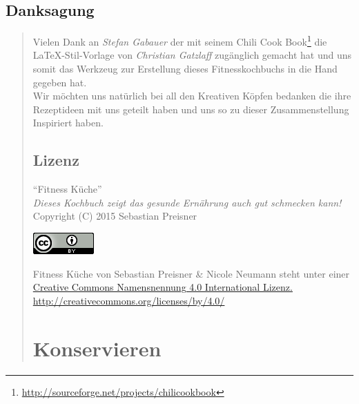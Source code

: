 \documentclass[a4paper,10pt]{scrartcl}
\begin{document}
\subsection*{\centering Danksagung}
\begin{quote}
Vielen Dank an \emph{Stefan Gabauer} der mit seinem Chili Cook Book\footnote{\url{http://sourceforge.net/projects/chilicookbook}} die \LaTeX-Stil-Vorlage von \emph{Christian Gatzlaff} zugänglich gemacht hat und uns somit das Werkzeug zur Erstellung dieses Fitnesskochbuchs in die Hand gegeben hat.\\

Wir möchten uns natürlich bei all den Kreativen Köpfen bedanken die ihre Rezeptideen mit uns geteilt haben und uns so zu dieser Zusammenstellung Inspiriert haben.
\vspace{2cm}

\subsection*{\centering Lizenz}
\begin{center}
"`Fitness Küche"'\\
\textit{Dieses Kochbuch zeigt das gesunde Ernährung auch gut schmecken kann!}\\
Copyright (C) 2015 Sebastian Preisner\\

\begin{center}
	\href{http://creativecommons.org/licenses/by-nc-sa/3.0/de/}{\includegraphics{cclogo.png}}
\end{center}

Fitness Küche von Sebastian Preisner & Nicole Neumann steht unter einer \\\href{http://creativecommons.org/licenses/by/4.0/}{Creative Commons Namensnennung 4.0 International Lizenz.}\\
\url{http://creativecommons.org/licenses/by/4.0/}
\end{center}


\section{Konservieren} %


\end{quote}
\end{document}
